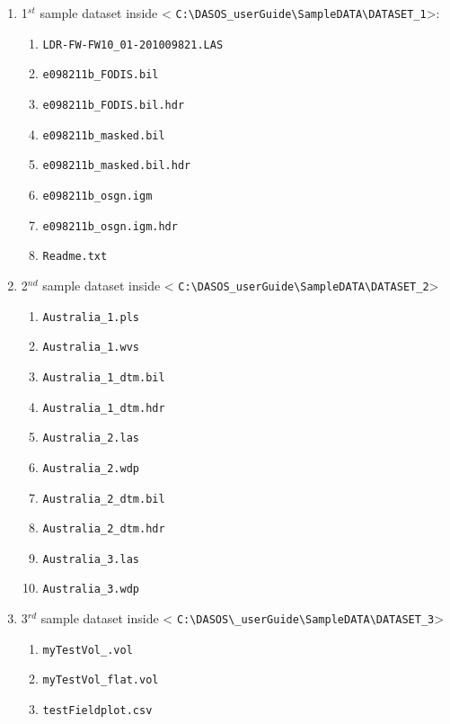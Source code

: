 \documentclass{subfiles}
\begin{document}
	   	\begin{enumerate}
	   		\item 1$^{st}$ sample dataset inside < \verb|C:\DASOS_userGuide\SampleDATA\DATASET_1|>: 
	   		\begin{enumerate}
	   			\item \verb|LDR-FW-FW10_01-201009821.LAS|
	   			\item \verb|e098211b_FODIS.bil|
	   			\item \verb|e098211b_FODIS.bil.hdr|
	   			\item \verb|e098211b_masked.bil|
	   			\item \verb|e098211b_masked.bil.hdr|
	   			\item \verb|e098211b_osgn.igm|
	   			\item \verb|e098211b_osgn.igm.hdr|
	   			\item \verb|Readme.txt|
	   		\end{enumerate}
	   		\item 2$^{nd}$ sample dataset inside < \verb|C:\DASOS_userGuide\SampleDATA\DATASET_2|>
	   		\begin{enumerate}
	   			\item \verb|Australia_1.pls|
	   			\item \verb|Australia_1.wvs|
	   			\item \verb|Australia_1_dtm.bil|
	   			\item \verb|Australia_1_dtm.hdr|
	   			\item \verb|Australia_2.las|
	   			\item \verb|Australia_2.wdp|
	   			\item \verb|Australia_2_dtm.bil|
	   			\item \verb|Australia_2_dtm.hdr|
	   			\item \verb|Australia_3.las|
	   			\item \verb|Australia_3.wdp|
	   		\end{enumerate}
	   		
	   		\item 3$^{rd}$ sample dataset inside < \verb|C:\DASOS\_userGuide\SampleDATA\DATASET_3|>
	   		\begin{enumerate}
	   			\item \verb|myTestVol_.vol|
	   			\item \verb|myTestVol_flat.vol|
	   			\item \verb|testFieldplot.csv|
	   		\end{enumerate}
	   		
	   	\end{enumerate}
	   	
\end{document}
